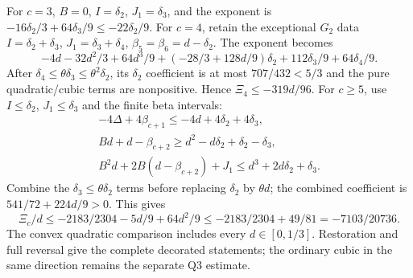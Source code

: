 For $c=3$, $B=0$, $I=\delta_{2}$, $J_1=\delta_{3}$, and the exponent is
$-16\delta_{2}/3+64\delta_{3}/9\le-22\delta_{2}/9$.
For $c=4$, retain the exceptional $G_2$ data
$I=\delta_{2}+\delta_{3}$, $J_1=\delta_{3}+\delta_{4}$, $\beta_5=\beta_6=d-\delta_{2}$.
The exponent becomes
\[
 -4d-32d^2/3+64d^3/9+(-28/3+128d/9)\delta_{2}+112\delta_{3}/9+64\delta_{4}/9.
\]
After $\delta_{4}\le\theta \delta_{3}\le\theta^2\delta_{2}$, its $\delta_{2}$ coefficient is at
most $707/432<5/3$ and the pure quadratic/cubic terms are nonpositive.
Hence $\Xi_4\le-319d/96$.
For $c\ge5$, use $I\le \delta_{2}$, $J_1\le \delta_{3}$ and the finite beta intervals:
\begin{gather*}
 -4\Delta+4\beta_{c+1}\le-4d+4\delta_{2}+4\delta_{3},\\
 Bd+d-\beta_{c+2}\ge d^2-d\delta_{2}+\delta_{2}-\delta_{3},\\
 B^2d+2B(d-\beta_{c+2})+J_1\le d^3+2d\delta_{2}+\delta_{3}.
\end{gather*}
Combine the $\delta_{3}\le\theta \delta_{2}$ terms before replacing $\delta_{2}$ by $\theta d$;
the combined coefficient is $541/72+224d/9>0$.
This gives
\[
 \Xi_c/d\le-2183/2304-5d/9+64d^2/9
 \le-2183/2304+49/81=-7103/20736.
\]
The convex quadratic comparison includes every $d\in[0,1/3]$.
Restoration and full reversal give the complete decorated statements;
the ordinary cubic in the same direction remains the separate Q3 estimate.
